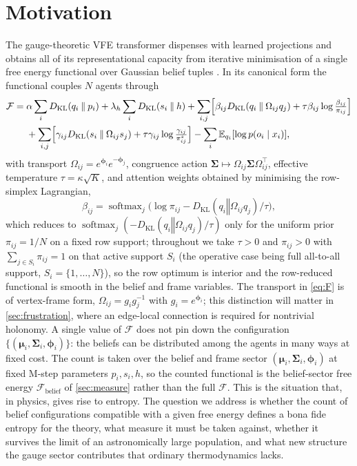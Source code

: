 \documentclass[11pt]{article}
\theoremstyle{plain}
\theoremstyle{definition}
\newcommand{\KL}[2]{D_{\mathrm{KL}}\mathopen{}\left(#1 \mathbin{\Vert} #2\right)\mathclose{}}
\newcommand{\E}{\mathbb{E}}
\newcommand{\softmax}{\operatorname{softmax}}
\newcommand{\bmu}{\boldsymbol{\mu}}
\newcommand{\bSigma}{\boldsymbol{\Sigma}}
\newcommand{\bphi}{\boldsymbol{\phi}}
\newcommand{\Fcal}{\mathcal{F}}
\newcommand{\Omegaij}{\Omega_{ij}}
\newcommand{\betaij}{\beta_{ij}}
\newcommand{\gammaij}{\gamma_{ij}}
\begin{document}
\section{Motivation}
\label{sec:motivation}

The gauge-theoretic VFE transformer dispenses with learned projections and obtains all
of its representational capacity from iterative minimisation of a single free energy
functional over Gaussian belief tuples \citep{vaswani2017attention,friston2010free}. In
its canonical form the functional couples $N$ agents through
\begin{equation}
\label{eq:F}
\begin{aligned}
\Fcal
={}& \alpha\sum_{i}\KL{q_i}{p_i}
+ \lambda_h\sum_i \KL{s_i}{h}
+ \sum_{i,j}\Bigl[\betaij \KL{q_i}{\Omegaij q_j} + \tau \betaij\log\tfrac{\betaij}{\pi_{ij}}\Bigr]\\
&{}+ \sum_{i,j}\Bigl[\gammaij \KL{s_i}{\Omegaij s_j} + \tau \gammaij\log\tfrac{\gammaij}{\pi^{s}_{ij}}\Bigr]
- \sum_i\E_{q_i}[\log p(o_i\mid x_i)],
\end{aligned}
\end{equation}
with transport $\Omegaij = e^{\bphi_i}e^{-\bphi_j}$, congruence action
$\bSigma\mapsto\Omegaij\bSigma\Omegaij^{\top}$, effective temperature $\tau=\kappa\sqrt{K}$,
and attention weights obtained by minimising the row-simplex Lagrangian,
\begin{equation}
\label{eq:softmax}
\betaij=\softmax_j\bigl(\log\pi_{ij}-\KL{q_i}{\Omegaij q_j}/\tau\bigr),
\end{equation}
which reduces to $\softmax_j(-\KL{q_i}{\Omegaij q_j}/\tau)$ only for the uniform prior
$\pi_{ij}=1/N$ on a fixed row support; throughout we take $\tau>0$ and $\pi_{ij}>0$ with
$\sum_{j\in S_i}\pi_{ij}=1$ on that active support $S_i$ (the operative case being full all-to-all
support, $S_i=\{1,\dots,N\}$), so the row optimum is interior and the row-reduced functional is
smooth in the belief and frame variables. The transport in \cref{eq:F} is of vertex-frame
form, $\Omegaij=g_i g_j^{-1}$ with $g_i=e^{\bphi_i}$; this distinction will matter in
\cref{sec:frustration}, where an edge-local connection is required for nontrivial
holonomy. A single value of $\Fcal$ does not pin down the configuration
$\{(\bmu_i,\bSigma_i,\bphi_i)\}$: the beliefs can be distributed among the agents in many
ways at fixed cost. The count is taken over the belief and frame sector
$(\bmu_i,\bSigma_i,\bphi_i)$ at fixed M-step parameters $p_i,s_i,h$, so the counted
functional is the belief-sector free energy $\Fcal_{\mathrm{belief}}$ of
\cref{sec:measure} rather than the full $\Fcal$. This is the situation that, in physics, gives rise to entropy. The
question we address is whether the count of belief configurations compatible with a
given free energy defines a bona fide entropy for the theory, what measure it must be
taken against, whether it survives the limit of an astronomically large population, and
what new structure the gauge sector contributes that ordinary thermodynamics lacks.
\end{document}
